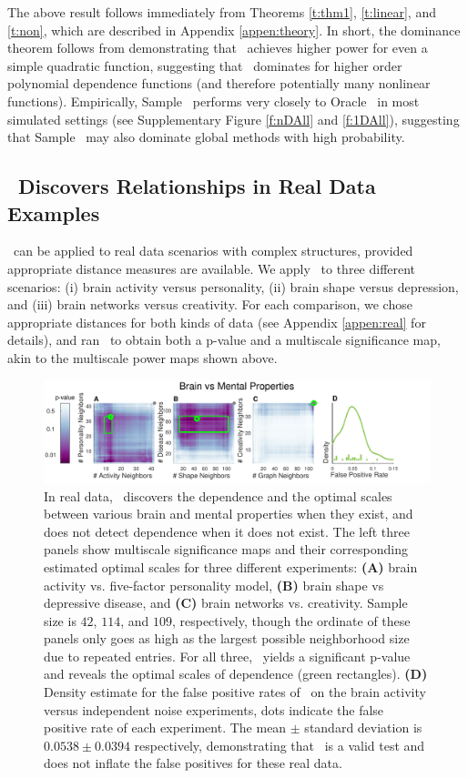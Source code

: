 \documentclass[11pt]{article}
\begin{document}
The above result follows immediately from Theorems \ref{t:thm1}, \ref{t:linear}, and \ref{t:non}, which are described in Appendix \ref{appen:theory}. In short, the dominance theorem follows from demonstrating that \Mgc~achieves higher power for even a simple quadratic function, suggesting that \Mgc~dominates for higher order polynomial dependence functions (and therefore potentially many nonlinear functions).
Empirically, Sample \Mgc~performs very closely to Oracle \Mgc~in most simulated settings (see Supplementary Figure \ref{f:nDAll} and \ref{f:1DAll}), suggesting that Sample \Mgc~may also dominate global methods with high probability.

\subsection*{\Mgc~Discovers Relationships in Real Data Examples}
\label{numer3}

\Mgc~can be applied to real data scenarios with complex structures, provided appropriate distance measures are available. We apply \Mgc~to three different scenarios: (i) brain activity versus personality, (ii) brain shape versus depression, and (iii) brain networks versus creativity.  For each comparison, we chose appropriate distances for both kinds of data (see Appendix \ref{appen:real} for details), and ran \Mgc~to obtain both a p-value and a multiscale significance map, akin to the multiscale power maps shown above. 


\begin{figure}[!ht]
\includegraphics[width=1.0\textwidth,trim={0 0 1.5cm 0},clip]{Figures/FigReal}
\caption{In real data, \Mgc~discovers the dependence and the optimal scales between various brain and mental properties when they exist, and does not detect dependence when it does not exist.  The left three panels show multiscale significance maps and their corresponding estimated optimal scales for three different experiments: \textbf{(A)}  brain activity vs. five-factor personality model, \textbf{(B)}  brain shape vs depressive disease, and \textbf{(C)} brain networks vs. creativity. Sample size is $42$, $114$, and $109$, respectively, though the ordinate of these panels only goes as high as the largest possible neighborhood size due to repeated entries.  
For all three, \Mgc~yields a significant p-value and reveals the optimal scales of dependence (green rectangles).
\textbf{(D)} Density estimate for the false positive rates of  \Mgc~on the brain activity versus  independent noise experiments, dots indicate the false positive rate of each experiment. The mean $\pm$ standard deviation is $0.0538 \pm 0.0394$ respectively, demonstrating that \Mgc~is a valid test and does not inflate the false positives for these real data.}
\label{f:real}
\end{figure}
\end{document}
